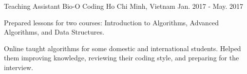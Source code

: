 \begin{cventries}
  \cventry
    {Teaching Assistant} %
    {Bio-O Coding} %
    {Ho Chi Minh, Vietnam} %
    {Jan. 2017 - May. 2017} %
    {
      \begin{cvitems} %
        \item {Prepared lessons for two courses: Introduction to Algorithms, Advanced Algorithms, and Data Structures.}
        \item {Online taught algorithms for some domestic and international students. Helped them improving knowledge, reviewing their coding style, and preparing for the interview.}
      \end{cvitems}
    }

\end{cventries}
